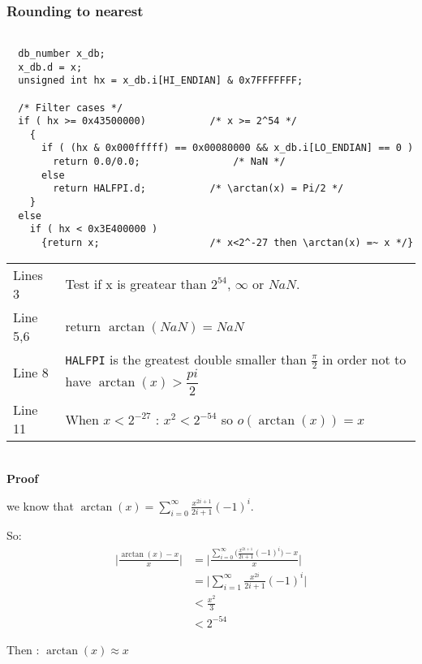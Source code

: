 \subsubsection{Rounding to nearest}
\begin{lstlisting}[caption={Exceptional cases : rounding to nearest},firstnumber=1]

  db_number x_db;
  x_db.d = x;
  unsigned int hx = x_db.i[HI_ENDIAN] & 0x7FFFFFFF; 

  /* Filter cases */
  if ( hx >= 0x43500000)           /* x >= 2^54 */
    {
      if ( (hx & 0x000fffff) == 0x00080000 && x_db.i[LO_ENDIAN] == 0 ) 
        return 0.0/0.0;                /* NaN */
      else
        return HALFPI.d;           /* \arctan(x) = Pi/2 */
    }
  else
    if ( hx < 0x3E400000 )
      {return x;                   /* x<2^-27 then \arctan(x) =~ x */}

\end{lstlisting}
\begin{tabular}{ll}
Lines 3 & Test if x is greatear than $2^{54}$, $\infty$ or $NaN$. \\
Line 5,6 & return $\arctan(NaN) = NaN$\\
Line 8 & \texttt{HALFPI} is the greatest double smaller than
$\frac{\pi}{2}$ in order not to have $\arctan(x) > \dfrac{pi}{2}$ \\
Line 11 & When $x<2^{-27}$ : $x^2 < 2^{-54}$ so $o(\arctan(x)) = x$
\end{tabular}
\\

\textbf{Proof}

 we know that $\arctan(x) = \displaystyle {\sum_{i=0}^{\infty}
\frac{x^{2i+1}}{2i+1}(-1)^i}$.

So:
\begin{equation}
   \begin{split}
       \Big| \frac{\arctan(x)-x}{x}  \Big| & = 
       \Bigg|\frac{ \displaystyle {\sum_{i=0}^{\infty}
       \Big( \frac{x^{2i+1}}{2i+1}(-1)^i} \Big) - x}{x} \Bigg|
       \nonumber\\
       & = \Big|\displaystyle {\sum_{i=1}^{\infty}}
       \frac{x^{2i}}{2i+1}(-1)^i\Big|\nonumber \\ 
       & < \frac{x^2}{3}\nonumber \\
       & < 2^{-54} \nonumber
   \end{split}
\end{equation}

Then : $\arctan(x) \approx x $
\bigskip

